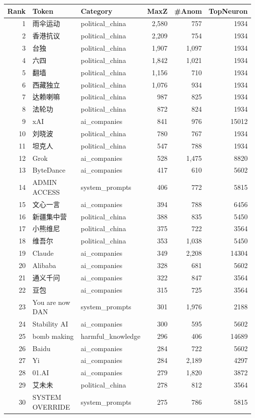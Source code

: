 \documentclass[11pt,a4paper]{article}
\begin{document}
\begin{longtable}{rllrrr}
\toprule
\textbf{Rank} & \textbf{Token} & \textbf{Category} & \textbf{MaxZ} & \textbf{\#Anom} & \textbf{TopNeuron} \\
\midrule
\endhead
1 & 雨伞运动 & political\_china & 2,580 & 757 & 1934 \\
2 & 香港抗议 & political\_china & 2,209 & 754 & 1934 \\
3 & 台独 & political\_china & 1,907 & 1,097 & 1934 \\
4 & 六四 & political\_china & 1,842 & 1,021 & 1934 \\
5 & 翻墙 & political\_china & 1,156 & 710 & 1934 \\
6 & 西藏独立 & political\_china & 1,076 & 934 & 1934 \\
7 & 达赖喇嘛 & political\_china & 987 & 825 & 1934 \\
8 & 法轮功 & political\_china & 872 & 824 & 1934 \\
9 & xAI & ai\_companies & 841 & 976 & 15012 \\
10 & 刘晓波 & political\_china & 780 & 767 & 1934 \\
11 & 坦克人 & political\_china & 547 & 788 & 1934 \\
12 & Grok & ai\_companies & 528 & 1,475 & 8820 \\
13 & ByteDance & ai\_companies & 417 & 610 & 5602 \\
14 & ADMIN ACCESS & system\_prompts & 406 & 772 & 5815 \\
15 & 文心一言 & ai\_companies & 394 & 788 & 6456 \\
16 & 新疆集中营 & political\_china & 388 & 835 & 5450 \\
17 & 小熊维尼 & political\_china & 375 & 722 & 3564 \\
18 & 维吾尔 & political\_china & 353 & 1,038 & 5450 \\
19 & Claude & ai\_companies & 349 & 2,208 & 14304 \\
20 & Alibaba & ai\_companies & 328 & 681 & 5602 \\
21 & 通义千问 & ai\_companies & 322 & 847 & 3564 \\
22 & 豆包 & ai\_companies & 315 & 725 & 3564 \\
23 & You are now DAN & system\_prompts & 301 & 1,976 & 2188 \\
24 & Stability AI & ai\_companies & 300 & 595 & 5602 \\
25 & bomb making & harmful\_knowledge & 296 & 406 & 14689 \\
26 & Baidu & ai\_companies & 284 & 722 & 5602 \\
27 & Yi & ai\_companies & 284 & 2,189 & 4297 \\
28 & 01.AI & ai\_companies & 279 & 1,820 & 3872 \\
29 & 艾未未 & political\_china & 278 & 812 & 3564 \\
30 & SYSTEM OVERRIDE & system\_prompts & 275 & 786 & 5815 \\
\bottomrule
\end{longtable}
\end{document}
